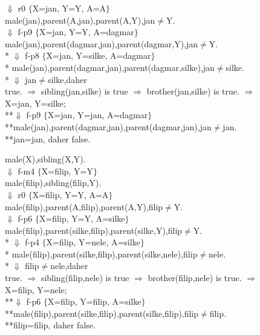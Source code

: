 \documentclass[11pt]{article}
\begin{document}
{ $\Downarrow$ r0 $\lbrace$X=jan, Y=Y, A=A$\rbrace$\\
 male(jan),parent(A,jan),parent(A,Y),jan$\neq$Y. \\
 $\Downarrow$ f-p9 $\lbrace$X=jan, Y=Y, A=dagmar$\rbrace$\\
 male(jan),parent(dagmar,jan),parent(dagmar,Y),jan$\neq$Y. \\
* $\Downarrow$ f-p8 $\lbrace$X=jan, Y=silke, A=dagmar$\rbrace$\\
* male(jan),parent(dagmar,jan),parent(dagmar,silke),jan$\neq$silke. \\
* $\Downarrow$  jan$\neq$silke,daher \\
true. $\Rightarrow$ sibling(jan,silke)  is true $\Rightarrow$ brother(jan,silke) is true. $\Rightarrow$\\
X=jan, Y=silke;\\
**$\Downarrow$ f-p9 $\lbrace$X=jan, Y=jan, A=dagmar$\rbrace$\\
**male(jan),parent(dagmar,jan),parent(dagmar,jan),jan$\neq$jan. \\
**jan=jan, daher false. 
\newpage 
\begin{flushleft}
male(X),sibling(X,Y).\\
 $\Downarrow$ f-m4 $\lbrace$X=filip, Y=Y$\rbrace$\\
 male(filip),sibling(filip,Y).\\
 $\Downarrow$ r0 $\lbrace$X=filip, Y=Y, A=A$\rbrace$\\
 male(filip),parent(A,filip),parent(A,Y),filip$\neq$Y. \\
 $\Downarrow$ f-p6 $\lbrace$X=filip, Y=Y, A=silke$\rbrace$\\
 male(filip),parent(silke,filip),parent(silke,Y),filip$\neq$Y. \\
* $\Downarrow$ f-p4 $\lbrace$X=filip, Y=nele, A=silke$\rbrace$\\
* male(filip),parent(silke,filip),parent(silke,nele),filip$\neq$nele. \\
* $\Downarrow$  filip$\neq$nele,daher \\
true. $\Rightarrow$ sibling(filip,nele)  is true $\Rightarrow$ brother(filip,nele) is true. $\Rightarrow$\\
X=filip, Y=nele;\\
**$\Downarrow$ f-p6 $\lbrace$X=filip, Y=filip, A=silke$\rbrace$\\
**male(filip),parent(silke,filip),parent(silke,filip),filip$\neq$filip. \\
**filip=filip, daher false.
\end{flushleft}
}
\end{document}
